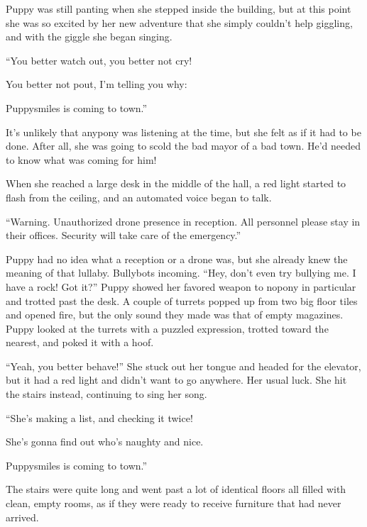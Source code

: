 Puppy was still panting when she stepped inside the building, but at this point she was so excited by her new adventure that she simply couldn't help giggling, and with the giggle she began singing.



\begin{song}
		``You better watch out, you better not cry!
	
		You better not pout, I'm telling you why:
	
		Puppysmiles is coming to town.''
\end{song}

It's unlikely that anypony was listening at the time, but she felt as if it had to be done. After all, she was going to scold the bad mayor of a bad town. He'd needed to know what was coming for him!

When she reached a large desk in the middle of the hall, a red light started to flash from the ceiling, and an automated voice began to talk.

{\mten ``Warning. Unauthorized drone presence in reception. All personnel please stay in their offices. Security will take care of the emergency.''}

Puppy had no idea what a reception or a drone was, but she already knew the meaning of that lullaby. Bullybots incoming. ``Hey, don't even try bullying me. I have a rock! Got it?'' Puppy showed her favored weapon to nopony in particular and trotted past the desk. A couple of turrets popped up from two big floor tiles and opened fire, but the only sound they made was that of empty magazines. Puppy looked at the turrets with a puzzled expression, trotted toward the nearest, and poked it with a hoof.

``Yeah, you better behave!'' She stuck out her tongue and headed for the elevator, but it had a red light and didn't want to go anywhere. Her usual luck. She hit the stairs instead, continuing to sing her song.

\begin{song}
	``She's making a list, and checking it twice!

	She's gonna find out who's naughty and nice.

	Puppysmiles is coming to town.''
\end{song}

The stairs were quite long and went past a lot of identical floors all filled with clean, empty rooms, as if they were ready to receive furniture that had never arrived.

